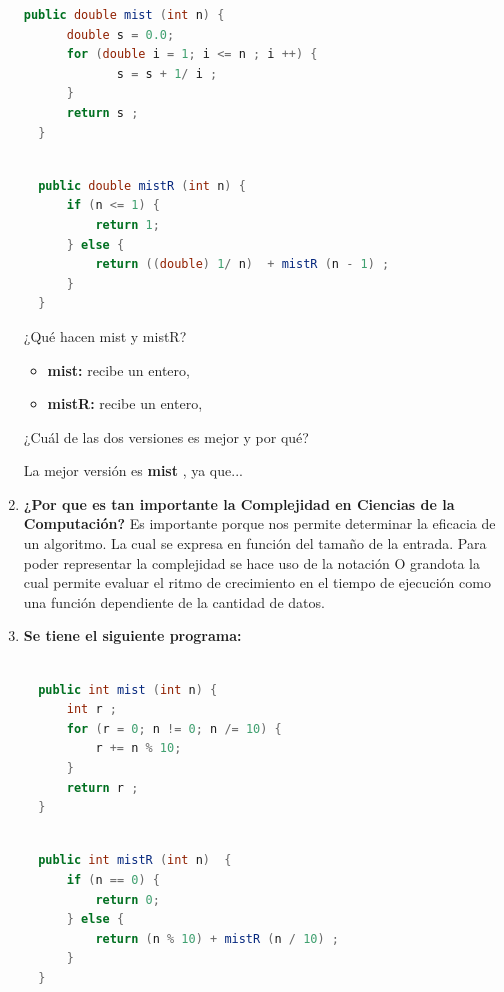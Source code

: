 \documentclass{report}
\begin{document}
\begin{enumerate}
\begin{lstlisting}[language=Java, caption=mist]
  public double mist (int n) {
      double s = 0.0;
      for (double i = 1; i <= n ; i ++) {
             s = s + 1/ i ;
      }
      return s ;
  }	
            \end{lstlisting}

            \begin{lstlisting}[language=Java, caption=mistR]

  public double mistR (int n) {
      if (n <= 1) {
          return 1;
      } else {
          return ((double) 1/ n)  + mistR (n - 1) ;
      } 
  }
            \end{lstlisting}

            \newline ¿Qué hacen mist y mistR?
            \begin{itemize}
                \item \textbf{mist: } recibe un entero, 
                \item \textbf{mistR: } recibe un entero, 
            \end{itemize}
            \newline ¿Cuál de las dos versiones es mejor y por qué?
               
            \newline La mejor versión es \textbf{mist }, ya que... 
    \item \textbf{¿Por que es tan importante la Complejidad en Ciencias de la Computación?}
			    \newline Es importante porque nos permite determinar la eficacia de un algoritmo. La cual se expresa en función del tamaño de la entrada.
                Para poder representar la complejidad se hace uso de la notación O grandota la cual permite evaluar el ritmo de crecimiento
                en el tiempo de ejecución como una función dependiente de la cantidad de datos.
	\item \textbf{Se tiene el siguiente programa:}	
            \begin{lstlisting}[language=Java, caption=mist]
            
  public int mist (int n) {
      int r ;
      for (r = 0; n != 0; n /= 10) {
          r += n % 10;
      }
      return r ;
  }
            \end{lstlisting}
           
            \begin{lstlisting}[language=Java, caption=mistR]
            
  public int mistR (int n)  {
      if (n == 0) {
          return 0;
      } else {
          return (n % 10) + mistR (n / 10) ;
      }
  }
            \end{lstlisting}


\end{enumerate}
\end{document}
